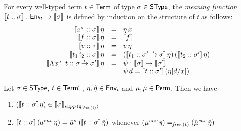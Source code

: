 \documentclass[12pt,a4paper]{report}
\newcommand{\senv}{\nstyle{env}}
\begin{document}
\begin{definition}
  For every well-typed term $t \in \mathsf{Term}$ of type $\sigma \in \mathsf{SType}$, the {\em meaning function}
  $\llbracket{t}\mathrel{::}{\sigma}\rrbracket: \mathsf{Env}_t \to \llbracket\sigma\rrbracket$ is defined by induction on the structure of $t$ as
  follows:
  \[\begin{array}{rcl}
    \llbracket{x^\sigma}\mathrel{::}{\sigma}\rrbracket\,\eta
      &=& \eta\,x \\
    \llbracket{f}\mathrel{::}{\sigma}\rrbracket\,\eta 
      &=& \llbracket f\rrbracket \\
    \llbracket{v}\mathrel{::}{\tau}\rrbracket\,\eta
      &=& v\,\eta \\
    \llbracket{t_1\,t_2}\mathrel{::}{\sigma}\rrbracket\,\eta
      &=& (\llbracket{t_1}\mathrel{::}{\sigma'\stackrel{_t}{\to}\sigma}\rrbracket\,\eta)\,
          (\llbracket{t_2}\mathrel{::}{\sigma'}\rrbracket\,\eta) \\
    \llbracket{\Lambda x^\sigma.\,t}\mathrel{::}{\sigma\stackrel{_t}{\to}\sigma'}\rrbracket\,\eta
      &=& \psi: \llbracket\sigma\rrbracket \to \llbracket\sigma'\rrbracket \\
      & & \psi\, d = \llbracket{t}\mathrel{::}{\sigma'}\rrbracket\,(\eta[d/x])
  \end{array}\]
\end{definition}

\begin{lemma} \label{lemma:meaning_function_of_t_is_well_defined}
  Let $\sigma \in \mathsf{SType}$, $t \in \mathsf{Term}^\sigma$, $\eta,\hat{\eta} \in \mathsf{Env}_t$ and $\mu,\hat{\mu}\in\mathsf{Perm}$. Then
  we have
  \begin{enumerate}
    \item $(\llbracket{t}\mathrel{::}{\sigma}\rrbracket\,\eta) \in \llbracket\sigma\rrbracket_{\mathit{supp}\,(\eta|_{\mathit{free}\,(t)})}$
    \item $\semantic{\tj{t}{\sigma}}\,(\mu^\senv\,\eta) = \hat{\mu}^\sigma\,(\semantic{\tj{t}{\sigma}}\,\hat{\eta})$
          whenever $(\mu^\senv\,\eta) =_{\free{t}} (\hat{\mu}^\senv\,\hat{\eta})$
  \end{enumerate}
\end{lemma}
\end{document}
